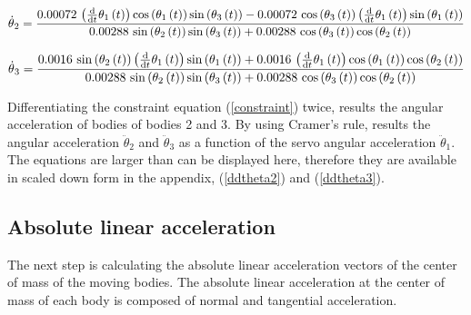 \begin{equation}\label{dtheta2}
\dot{\theta}{_2} =	{\frac { 0.00072\, \left( {\frac {\rm d}{{\rm d}t}}\theta_{{1}}
 \left( t \right)  \right) \cos \left( \theta_{{1}} \left( t \right) 
 \right) \sin \left( \theta_{{3}} \left( t \right)  \right) - 0.00072
\,\cos \left( \theta_{{3}} \left( t \right)  \right)  \left( {\frac 
{\rm d}{{\rm d}t}}\theta_{{1}} \left( t \right)  \right) \sin \left( 
\theta_{{1}} \left( t \right)  \right) }{ 0.00288\,\sin \left( \theta_
{{2}} \left( t \right)  \right) \sin \left( \theta_{{3}} \left( t
 \right)  \right) + 0.00288\,\cos \left( \theta_{{3}} \left( t
 \right)  \right) \cos \left( \theta_{{2}} \left( t \right)  \right) }
}
\end{equation}

\begin{equation}\label{dtheta3}
\dot{\theta}{_3} =	{\frac { 0.0016\,\sin \left( \theta_{{2}} \left( t \right)  \right) 
 \left( {\frac {\rm d}{{\rm d}t}}\theta_{{1}} \left( t \right) 
 \right) \sin \left( \theta_{{1}} \left( t \right)  \right) + 0.0016\,
 \left( {\frac {\rm d}{{\rm d}t}}\theta_{{1}} \left( t \right) 
 \right) \cos \left( \theta_{{1}} \left( t \right)  \right) \cos
 \left( \theta_{{2}} \left( t \right)  \right) }{ 0.00288\,\sin
 \left( \theta_{{2}} \left( t \right)  \right) \sin \left( \theta_{{3}
} \left( t \right)  \right) + 0.00288\,\cos \left( \theta_{{3}}
 \left( t \right)  \right) \cos \left( \theta_{{2}} \left( t \right) 
 \right) }}
\end{equation}

Differentiating the constraint equation (\ref{constraint}) twice, results the angular acceleration of bodies of bodies 2 and 3. By using Cramer's rule, results the angular acceleration $\ddot{\theta}{_2}$ and $\ddot{\theta}{_3}$ as a function of the servo angular acceleration $\ddot{\theta}{_1}$. The equations are larger than can be displayed here, therefore they are available in scaled down form in the appendix,  (\ref{ddtheta2}) and  (\ref{ddtheta3}).

\subsection{Absolute linear acceleration}

The next step is calculating the absolute linear acceleration vectors of the center of mass of the moving bodies. The absolute linear acceleration at the center of mass of each body is composed of normal and tangential acceleration. 

